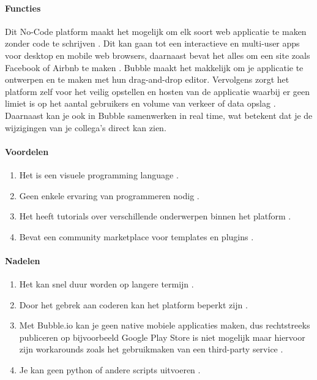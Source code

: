 \paragraph{Functies}
Dit No-Code platform maakt het mogelijk om elk soort web applicatie te maken zonder code te schrijven \autocite{Bubble2024b}.
Dit kan gaan tot een interactieve en multi-user apps voor desktop en mobile web browsers, daarnaast bevat het alles om een site zoals Facebook of Airbnb te maken \autocite{Bubble2024b}.
Bubble maakt het makkelijk om je applicatie te ontwerpen en te maken met hun drag-and-drop editor.
Vervolgens zorgt het platform zelf voor het veilig opstellen en hosten van de applicatie waarbij er geen limiet is op het aantal gebruikers en volume van verkeer of data opslag \autocite{Bubble2024b}.
Daarnaast kan je ook in Bubble samenwerken in real time, wat betekent dat je de wijzigingen van je collega's direct kan zien.
\paragraph*{Voordelen}
\begin{enumerate}
    \item Het is een visuele programming language \autocite{Minor2022}.
    \item Geen enkele ervaring van programmeren nodig \autocite{Minor2022}.
    \item Het heeft tutorials over verschillende onderwerpen binnen het platform \autocite{Minor2022}.
    \item Bevat een community marketplace voor templates en plugins \autocite{Minor2022}.
\end{enumerate}


\paragraph*{Nadelen}
\begin{enumerate}
    \item Het kan snel duur worden op langere termijn \autocite{Minor2022}.
    \item Door het gebrek aan coderen kan het platform beperkt zijn \autocite{Minor2022}.
    \item Met Bubble.io kan je geen native mobiele applicaties maken, dus rechtstreeks publiceren op bijvoorbeeld Google Play Store is niet mogelijk
    maar hiervoor zijn workarounds zoals het gebruikmaken van een third-party service \autocite{Sharma2022}.
    \item Je kan geen python of andere scripts uitvoeren \autocite{Sharma2022}.
\end{enumerate}

